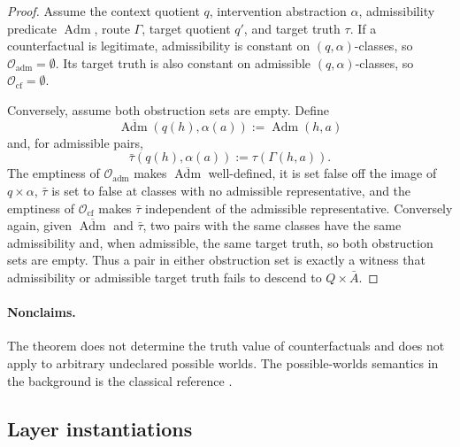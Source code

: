 \begin{proof}
Assume the context quotient \(q\), intervention abstraction
\(\alpha\), admissibility predicate \(\operatorname{Adm}\), route
\(\Gamma\), target quotient \(q'\), and target truth \(\tau\).  If a
counterfactual is legitimate, admissibility is constant on
\((q,\alpha)\)-classes, so
\(\mathcal O_{\mathrm{adm}}=\emptyset\).  Its target truth is also
constant on admissible \((q,\alpha)\)-classes, so
\(\mathcal O_{\mathrm{cf}}=\emptyset\).

Conversely, assume both obstruction sets are empty.  Define
\[
  \overline{\operatorname{Adm}}(q(h),\alpha(a)):=\operatorname{Adm}(h,a)
\]
and, for admissible pairs,
\[
  \bar\tau(q(h),\alpha(a)):=\tau(\Gamma(h,a)).
\]
The emptiness of \(\mathcal O_{\mathrm{adm}}\) makes
\(\overline{\operatorname{Adm}}\) well-defined, it is set false off the image of \(q\times\alpha\), \(\bar\tau\) is set to false at classes with no admissible representative, and the emptiness of
\(\mathcal O_{\mathrm{cf}}\) makes \(\bar\tau\) independent of the
admissible representative.  Conversely again, given
\(\overline{\operatorname{Adm}}\) and \(\bar\tau\), two pairs with the
same classes have the same admissibility and, when admissible, the
same target truth, so both obstruction sets are empty.  Thus a pair in either obstruction set is exactly a witness that
admissibility or admissible target truth fails to descend to
\(Q\times\bar A\).
\end{proof}

\paragraph{Nonclaims.} The theorem does not determine the truth value of counterfactuals and
does not apply to arbitrary undeclared possible worlds.  The
possible-worlds semantics in the background is the classical reference
\citep{Lewis1973Counterfactuals}.

\subsection*{Layer instantiations}\label{layer-inst:F31}

